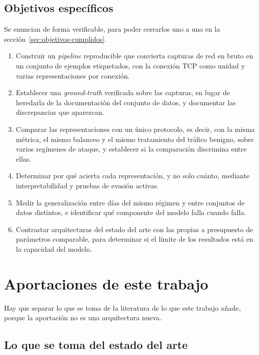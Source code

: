\subsection{Objetivos específicos}

Se enuncian de forma verificable, para poder cerrarlos uno a uno en la
sección~\ref{sec:objetivos-cumplidos}.

\begin{enumerate}
  \item[\textbf{O1}] Construir un \emph{pipeline} reproducible que convierta
        capturas de red en bruto en un conjunto de ejemplos etiquetados, con la
        conexión TCP como unidad y varias representaciones por conexión.
  \item[\textbf{O2}] Establecer una \emph{ground-truth} verificada sobre las
        capturas, en lugar de heredarla de la documentación del conjunto de
        datos, y documentar las discrepancias que aparezcan.
  \item[\textbf{O3}] Comparar las representaciones con un único protocolo, es
        decir, con la misma métrica, el mismo balanceo y el mismo tratamiento
        del tráfico benigno, sobre varios regímenes de ataque, y establecer si
        la comparación discrimina entre ellas.
  \item[\textbf{O4}] Determinar por qué acierta cada representación, y no solo
        cuánto, mediante interpretabilidad y pruebas de evasión activas.
  \item[\textbf{O5}] Medir la generalización entre días del mismo régimen y
        entre conjuntos de datos distintos, e identificar qué componente del
        modelo falla cuando falla.
  \item[\textbf{O6}] Contrastar arquitecturas del estado del arte con las
        propias a presupuesto de parámetros comparable, para determinar si el
        límite de los resultados está en la capacidad del modelo.
\end{enumerate}

\section{Aportaciones de este trabajo}
\label{sec:aportaciones}

Hay que separar lo que se toma de la literatura de lo que este trabajo añade,
porque la aportación no es una arquitectura nueva.

\subsection*{Lo que se toma del estado del arte}

